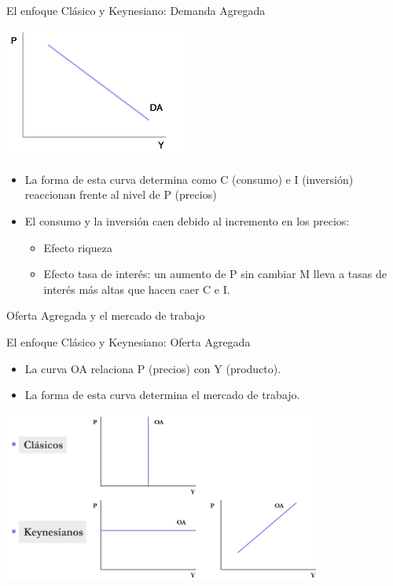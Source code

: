 \documentclass{beamer}
\begin{document}
\begin{frame}{El enfoque Clásico y Keynesiano: Demanda Agregada}

\centering\includegraphics[width=6cm]{Slides Principios de Economia/Figures/P20.png}\

    \begin{itemize}
        \item La forma de esta curva determina como C (consumo) e I (inversión) reaccionan frente al nivel de P (precios)
        \item El consumo y la inversión caen debido al incremento en los precios:
            \begin{itemize}
                \item Efecto riqueza
                \item Efecto tasa de interés: un aumento de P sin cambiar M lleva a tasas de interés más altas que hacen caer C e I.
            \end{itemize}
    \end{itemize}

\end{frame}


\begin{frame}{Oferta Agregada y el mercado de trabajo}


\end{frame}


\begin{frame}{El enfoque Clásico y Keynesiano: Oferta Agregada}

\begin{itemize}
        \footnotesize\item La curva OA relaciona P (precios) con Y (producto).
        \footnotesize\item La forma de esta curva determina el mercado de trabajo.
\end{itemize}
\vspace{3mm}
\centering\includegraphics[width=10.5cm]{Slides Principios de Economia/Figures/P19.png}\

\end{frame}
\end{document}
